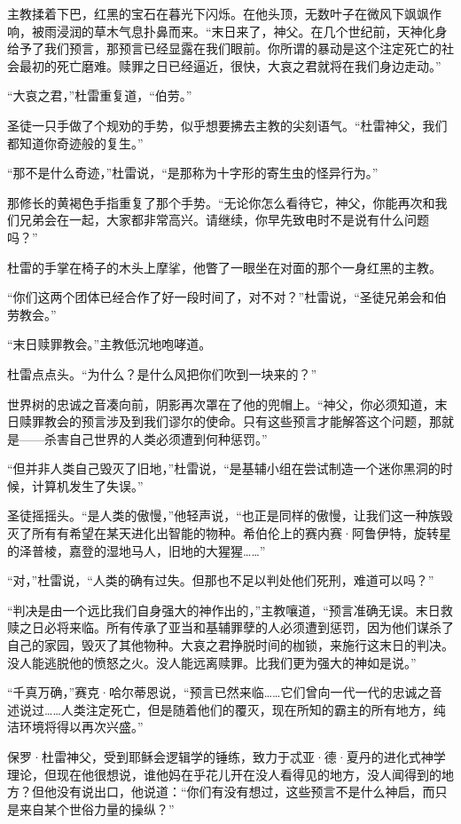 \documentclass[AutoFakeBold=true]{book}
\begin{document}
主教揉着下巴，红黑的宝石在暮光下闪烁。在他头顶，无数叶子在微风下飒飒作响，被雨浸润的草木气息扑鼻而来。``末日来了，神父。在几个世纪前，天神化身给予了我们预言，那预言已经显露在我们眼前。你所谓的暴动是这个注定死亡的社会最初的死亡磨难。赎罪之日已经逼近，很快，大哀之君就将在我们身边走动。''

``大哀之君，''杜雷重复道，``伯劳。''

圣徒一只手做了个规劝的手势，似乎想要拂去主教的尖刻语气。``杜雷神父，我们都知道你奇迹般的复生。''

``那不是什么奇迹，''杜雷说，``是那称为十字形的寄生虫的怪异行为。''

那修长的黄褐色手指重复了那个手势。``无论你怎么看待它，神父，你能再次和我们兄弟会在一起，大家都非常高兴。请继续，你早先致电时不是说有什么问题吗？''

杜雷的手掌在椅子的木头上摩挲，他瞥了一眼坐在对面的那个一身红黑的主教。

``你们这两个团体已经合作了好一段时间了，对不对？''杜雷说，``圣徒兄弟会和伯劳教会。''

``末日赎罪教会。''主教低沉地咆哮道。

杜雷点点头。``为什么？是什么风把你们吹到一块来的？''

世界树的忠诚之音凑向前，阴影再次罩在了他的兜帽上。``神父，你必须知道，末日赎罪教会的预言涉及到我们谬尔的使命。只有这些预言才能解答这个问题，那就是——杀害自己世界的人类必须遭到何种惩罚。''

``但并非人类自己毁灭了旧地，''杜雷说，``是基辅小组在尝试制造一个迷你黑洞的时候，计算机发生了失误。''

圣徒摇摇头。``是人类的傲慢，''他轻声说，``也正是同样的傲慢，让我们这一种族毁灭了所有有希望在某天进化出智能的物种。希伯伦上的赛内赛·阿鲁伊特，旋转星的泽普棱，嘉登的湿地马人，旧地的大猩猩……''

``对，''杜雷说，``人类的确有过失。但那也不足以判处他们死刑，难道可以吗？''

``判决是由一个远比我们自身强大的神作出的，''主教嚷道，``预言准确无误。末日救赎之日必将来临。所有传承了亚当和基辅罪孽的人必须遭到惩罚，因为他们谋杀了自己的家园，毁灭了其他物种。大哀之君挣脱时间的枷锁，来施行这末日的判决。没人能逃脱他的愤怒之火。没人能远离赎罪。比我们更为强大的神如是说。''

``千真万确，''赛克·哈尔蒂恩说，``预言已然来临……它们曾向一代一代的忠诚之音述说过……人类注定死亡，但是随着他们的覆灭，现在所知的霸主的所有地方，纯洁环境将得以再次兴盛。''

保罗·杜雷神父，受到耶稣会逻辑学的锤练，致力于忒亚·德·夏丹的进化式神学理论，但现在他很想说，{\kaishu 谁他妈在乎花儿开在没人看得见的地方，没人闻得到的地方？}但他没有说出口，他说道：``你们有没有想过，这些预言不是什么神启，而只是来自某个世俗力量的操纵？''
\end{document}
